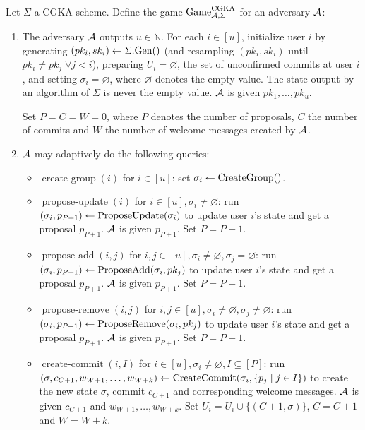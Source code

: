 \begin{definition}
	Let $\Sigma$ a CGKA scheme. Define the game $\mathrm{Game}_{\mathcal{A}, \Sigma}^{\mathrm{CGKA}}$ for an adversary $\mathcal{A}$:
	\begin{enumerate}[1.]
		\item \label{def:cgka-game-step-1} The adversary $\mathcal{A}$ outputs $u \in \mathbb{N}$. For each $i \in [u]$, initialize user $i$ by generating $(pk_i, sk_i) \leftarrow \Sigma.\mathrm{Gen}()$ (and resampling $(pk_i, sk_i)$ until $pk_i \neq pk_j \; \forall j < i$), preparing $U_i = \varnothing$, the set of unconfirmed commits at user $i$, and setting $\sigma_i = \varnothing$, where $\varnothing$ denotes the empty value. The state output by an algorithm of $\Sigma$ is never the empty value. $\mathcal{A}$ is given $pk_1, \ldots, pk_u$.

		      Set $P = C = W = 0$, where $P$ denotes the number of proposals, $C$ the number of commits and $W$ the number of welcome messages created by $\mathcal{A}$.
		\item $\mathcal{A}$ may adaptively do the following queries:
		      \begin{itemize}
			      \item $\operatorname{create-group}(i)$ for $i \in [u]$: set $\sigma_i \leftarrow \operatorname{CreateGroup}()$.
			      \item $\operatorname{propose-update}(i)$ for $i \in [u], \sigma_i \neq \varnothing$: run $(\sigma_i, p_{P + 1}) \leftarrow \operatorname{ProposeUpdate}(\sigma_i)$ to update user $i$'s state and get a proposal $p_{P + 1}$. $\mathcal{A}$ is given $p_{P + 1}$. Set $P = P + 1$.
			      \item $\operatorname{propose-add}(i, j)$ for $i, j \in [u], \sigma_i \neq \varnothing, \sigma_j = \varnothing$: run $(\sigma_i, p_{P + 1}) \leftarrow \operatorname{ProposeAdd}(\sigma_i, pk_j)$ to update user $i$'s state and get a proposal $p_{P + 1}$. $\mathcal{A}$ is given $p_{P + 1}$. Set $P = P + 1$.
			      \item $\operatorname{propose-remove}(i, j)$ for $i, j \in [u], \sigma_i \neq \varnothing, \sigma_j \neq \varnothing$: run $(\sigma_i, p_{P + 1}) \leftarrow \operatorname{ProposeRemove}(\sigma_i, pk_j)$ to update user $i$'s state and get a proposal $p_{P + 1}$. $\mathcal{A}$ is given $p_{P + 1}$. Set $P = P + 1$.
			      \item $\operatorname{create-commit}(i, I)$ for $i \in [u], \sigma_i \neq \varnothing, I \subseteq [P]$: run $(\sigma, c_{C + 1}, w_{W + 1}, \ldots, w_{W + k}) \leftarrow \operatorname{CreateCommit}(\sigma_i, \{p_j \mid j \in I\})$ to create the new state $\sigma$, commit $c_{C + 1}$ and corresponding welcome messages. $\mathcal{A}$ is given $c_{C + 1}$ and $w_{W + 1}, \ldots, w_{W + k}$. Set $U_i = U_i \cup \{(C + 1, \sigma)\}$, $C = C + 1$ and $W = W + k$.

\end{itemize}
\end{enumerate}
\end{definition}
